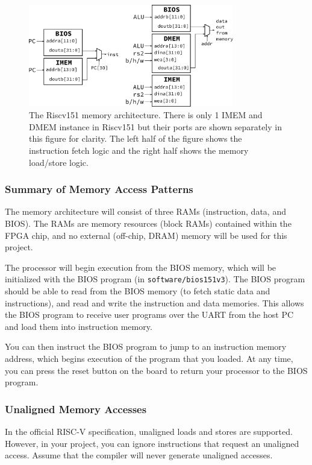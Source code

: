 \documentclass[11pt]{article}
\begin{document}
\begin{figure}[hbt]
  \begin{center}
    \includegraphics[width=0.8\textwidth]{memory_arch.pdf}
    \caption{The Riscv151 memory architecture. There is only 1 IMEM and DMEM instance in Riscv151 but their ports are shown separately in this figure for clarity. The left half of the figure shows the instruction fetch logic and the right half shows the memory load/store logic.}
    \label{fig:mem_arch}
  \end{center}
\end{figure}

\subsubsection{Summary of Memory Access Patterns}
The memory architecture will consist of three RAMs (instruction, data, and BIOS).
The RAMs are memory resources (block RAMs) contained within the FPGA chip, and no external (off-chip, DRAM) memory will be used for this project.

The processor will begin execution from the BIOS memory, which will be initialized with the BIOS program (in \verb|software/bios151v3|).
The BIOS program should be able to read from the BIOS memory (to fetch static data and instructions), and read and write the instruction and data memories.
This allows the BIOS program to receive user programs over the UART from the host PC and load them into instruction memory.

You can then instruct the BIOS program to jump to an instruction memory address, which begins execution of the program that you loaded.
At any time, you can press the reset button on the board to return your processor to the BIOS program.

\subsubsection{Unaligned Memory Accesses}
In the official RISC-V specification, unaligned loads and stores are supported.
However, in your project, you can ignore instructions that request an unaligned access.
Assume that the compiler will never generate unaligned accesses.
\end{document}

